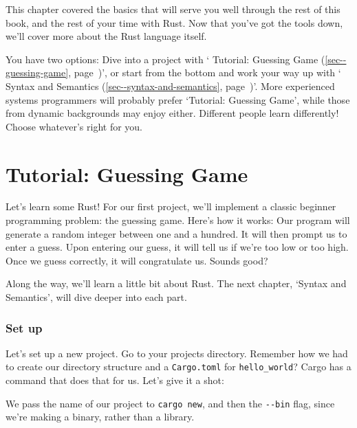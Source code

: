 \documentclass[a4paper,]{book}
\renewcommand*{\hypertarget}[3][\ar]{%
  \def\ar{#2}%
  \label{#1}%
  #3}
\renewcommand*{\hyperlink}[2]{%
 #2 (\autoref{#1}, page~\pageref{#1})}
\newenvironment{Shaded}{\begin{snugshade}}{\end{snugshade}}
\newcommand{\KeywordTok}[1]{\textcolor[rgb]{0.13,0.29,0.53}{\textbf{{#1}}}}
\newcommand{\NormalTok}[1]{{#1}}
\begin{document}
This chapter covered the basics that will serve you well through the
rest of this book, and the rest of your time with Rust. Now that you've
got the tools down, we'll cover more about the Rust language itself.

You have two options: Dive into a project with
`\protect\hyperlink{sec--guessing-game}{Tutorial: Guessing Game}', or
start from the bottom and work your way up with
`\protect\hyperlink{sec--syntax-and-semantics}{Syntax and Semantics}'.
More experienced systems programmers will probably prefer `Tutorial:
Guessing Game', while those from dynamic backgrounds may enjoy either.
Different people learn differently! Choose whatever's right for you.

\hypertarget{sec--guessing-game}{\chapter{Tutorial: Guessing
Game}\label{sec--guessing-game}}

Let's learn some Rust! For our first project, we'll implement a classic
beginner programming problem: the guessing game. Here's how it works:
Our program will generate a random integer between one and a hundred. It
will then prompt us to enter a guess. Upon entering our guess, it will
tell us if we're too low or too high. Once we guess correctly, it will
congratulate us. Sounds good?

Along the way, we'll learn a little bit about Rust. The next chapter,
`Syntax and Semantics', will dive deeper into each part.

\subsection{Set up}\label{set-up}

Let's set up a new project. Go to your projects directory. Remember how
we had to create our directory structure and a \texttt{Cargo.toml} for
\texttt{hello\_world}? Cargo has a command that does that for us. Let's
give it a shot:

\begin{Shaded}
\end{Shaded}

We pass the name of our project to \texttt{cargo\ new}, and then the
\texttt{-\/-bin} flag, since we're making a binary, rather than a
library.
\end{document}
